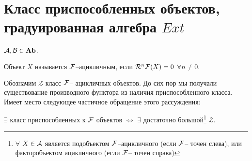\documentclass[../main.tex]{subfiles}
\begin{document}
\section{Класс приспособленных объектов, градуированная алгебра $Ext$}
$\mathcal{A}, \mathcal{B} \in \mathbf{Ab}$. 
\begin{to_def}
Объект $X$ называется $\mathcal{F}$--ацикличным, если $\mathcal{R}^{n}\mathcal{F}(X) = 0$ $\forall n\neq 0$.
\end{to_def}
Обозначим $\mathcal{Z}$ класс $\mathcal{F}$-- ацикличных объектов. До сих пор мы получали существование производного функтора из наличия приспособленного класса. Имеет место следующее частичное обращение этого рассуждения:
\begin{to_claim}
$\exists$ класс приспособленных к $\mathcal{F}$ объектов $\Leftrightarrow$
    $\exists$ достаточно большой\footnote{$\forall$ $X \in \mathcal{A}$ является подобъектом $\mathcal{F}$--ацикличного (если $\mathcal{F}$-- точен слева), или факторобъектом ацикличного (если $\mathcal{F}$-- точен справа)} $\mathcal{Z}$.
\end{to_claim}
\end{document}
